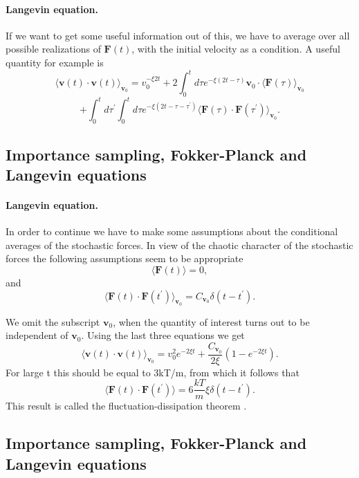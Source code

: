 \documentclass[%
oneside,                 %
final,                   %
10pt]{article}
\begin{document}
\paragraph{Langevin equation.}
If we want to get some useful information out of this, we have to average over all possible realizations of 
$\mathbf{F}(t)$, with the initial velocity as a condition. A useful quantity for example is
\[ 
\langle \mathbf{v}(t)\cdot \mathbf{v}(t)\rangle_{\mathbf{v}_{0}}=v_{0}^{-\xi 2t}
+2\int_{0}^{t}d\tau e^{-\xi (2t-\tau)}\mathbf{v}_{0}\cdot \langle \mathbf{F}(\tau )\rangle_{\mathbf{v}_{0}}
\]
\[  	  	
 +\int_{0}^{t}d\tau ^{\prime }\int_{0}^{t}d\tau e^{-\xi (2t-\tau -\tau ^{\prime })}
\langle \mathbf{F}(\tau )\cdot \mathbf{F}(\tau ^{\prime })\rangle_{ \mathbf{v}_{0}}.
\]



\subsection{Importance sampling, Fokker-Planck and Langevin equations}

\paragraph{Langevin equation.}
In order to continue we have to make some assumptions about the conditional averages of the stochastic forces. 
In view of the chaotic character of the stochastic forces the following 
assumptions seem to be appropriate
\[ 
\langle \mathbf{F}(t)\rangle=0, 
\]
and
\[
\langle \mathbf{F}(t)\cdot \mathbf{F}(t^{\prime })\rangle_{\mathbf{v}_{0}}=  C_{\mathbf{v}_{0}}\delta (t-t^{\prime }).
\] 	

We omit the subscript $\mathbf{v}_{0}$, when the quantity of interest turns out to be independent of $\mathbf{v}_{0}$. Using the last three equations we get
 \[
\langle \mathbf{v}(t)\cdot \mathbf{v}(t)\rangle_{\mathbf{v}_{0}}=v_{0}^{2}e^{-2\xi t}+\frac{C_{\mathbf{v}_{0}}}{2\xi }(1-e^{-2\xi t}).
\]
For large t this should be equal to 3kT/m, from which it follows that
\[
\langle \mathbf{F}(t)\cdot \mathbf{F}(t^{\prime })\rangle =6\frac{kT}{m}\xi \delta (t-t^{\prime }). 
\]
This result is called the fluctuation-dissipation theorem .



\subsection{Importance sampling, Fokker-Planck and Langevin equations}
\end{document}
